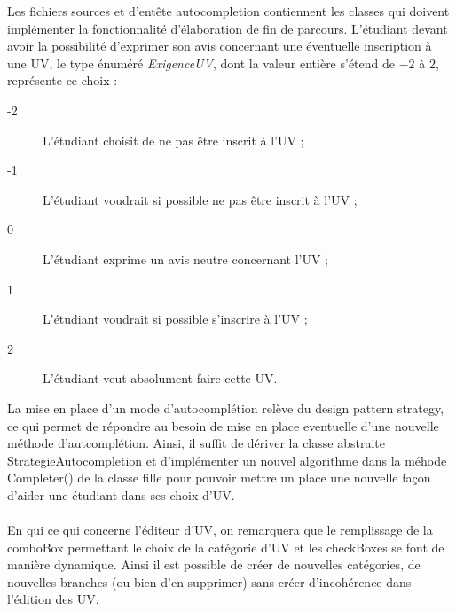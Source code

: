 \documentclass[a4paper,10pt,french]{report}
\begin{document}
	
	Les fichiers sources et d'entête autocompletion contiennent les classes qui doivent implémenter la fonctionnalité d'élaboration de fin  de parcours.
	L'étudiant devant avoir la possibilité d'exprimer son avis concernant une éventuelle inscription à une UV, le type énuméré \emph{ExigenceUV}, dont la valeur entière s'étend de $-2$ à $2$, représente ce choix : 
	\begin{description}
	\item[-2] L'étudiant choisit de ne pas être inscrit à l'UV ;
	\item[-1] L'étudiant voudrait si possible ne pas être inscrit à l'UV ;	
	\item[0] L'étudiant exprime un avis neutre concernant l'UV ;
	\item[1] L'étudiant voudrait si possible s'inscrire à l'UV ;
	\item[2] L'étudiant veut absolument faire cette UV.
	\end{description}
	
	La mise en place d'un mode d'autocomplétion relève du design pattern strategy, ce qui permet de répondre au besoin de mise en place eventuelle d'une nouvelle méthode d'autcomplétion.
	Ainsi, il suffit de dériver la classe abstraite StrategieAutocompletion et d'implémenter un nouvel algorithme dans la méhode Completer() de la classe fille pour pouvoir mettre un place une nouvelle façon d'aider une étudiant dans ses choix d'UV.\\\\
	
	En qui ce qui concerne l'éditeur d'UV, on remarquera que le remplissage de la comboBox permettant le choix de la catégorie d'UV et les checkBoxes se font de manière dynamique. Ainsi il est possible de créer de nouvelles catégories, de nouvelles branches (ou bien d'en supprimer) sans créer d'incohérence dans l'édition des UV.
	
	
	
	
	
		\subsubsection{}
			\paragraph{}
			\paragraph{}
\end{document}
